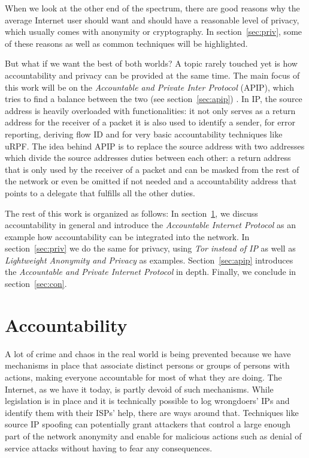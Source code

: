 \documentclass{acm_proc_article-sp}
\begin{document}
When we look at the other end of the spectrum, there are good reasons why the average Internet user should want and should have a reasonable level of privacy, which usually comes with anonymity or cryptography. In section~\ref{sec:priv}, some of these reasons as well as common techniques will be highlighted.

But what if we want the best of both worlds? A topic rarely touched yet is how accountability and privacy can be provided at the same time. The main focus of this work will be on the \emph{Accountable and Private Inter Protocol} (APIP), which tries to find a balance between the two (see section~\ref{sec:apip}) \cite{apip}. In IP, the source address is heavily overloaded with functionalities: it not only serves as a return address for the receiver of a packet it is also used to identify a sender, for error reporting, deriving flow ID and for very basic accountability techniques like uRPF. The idea behind APIP is to replace the source address with two addresses which divide the source addresses duties between each other: a return address that is only used by the receiver of a packet and can be masked from the rest of the network or even be omitted if not needed and a accountability address that points to a delegate that fulfills all the other duties.

The rest of this work is organized as follows: In section~\ref{sec:acc}, we discuss accountability in general and introduce the \emph{Accountable Internet Protocol} as an example how accountability can be integrated into the network. In section~\ref{sec:priv} we do the same for privacy, using \emph{Tor instead of IP} as well as \emph{Lightweight Anonymity and Privacy} as examples. Section~\ref{sec:apip} introduces the \emph{Accountable and Private Internet Protocol} in depth. Finally, we conclude in section~\ref{sec:con}.



\section{Accountability}
\label{sec:acc}
A lot of crime and chaos in the real world is being prevented because we have mechanisms in place that associate distinct persons or groups of persons with actions, making everyone accountable for most of what they are doing. The Internet, as we have it today, is partly devoid of such mechanisms. While legislation is in place and it is technically possible to log wrongdoers' IPs and identify them with their ISPs' help, there are ways around that. Techniques like source IP spoofing can potentially grant attackers that control a large enough part of the network anonymity and enable for malicious actions such as denial of service attacks without having to fear any consequences.
\end{document}
